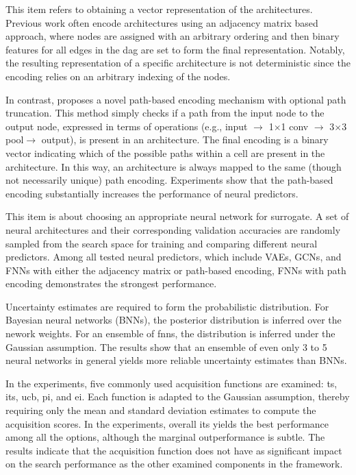 \documentclass[a4paper,oneside,bibliography=totoc]{scrbook}
\begin{document}
\begin{description}[leftmargin=0cm, listparindent=\parindent]
	\item [Architecture Encoding] This item refers to obtaining a vector representation of the architectures. Previous work often encode architectures using an adjacency matrix based approach, where nodes are assigned with an arbitrary ordering  and then binary features for all edges in the \gls{dag} are set to form the final representation.	Notably, the resulting representation of a specific architecture is not deterministic since the encoding  relies on an arbitrary indexing of the nodes. 
 
	In contrast, \cite{white2019bananas} proposes a novel path-based encoding mechanism with optional path truncation. This method simply checks if a path from the input node to the output node, expressed in terms of operations (e.g., input $\rightarrow$ 1$\times$1 conv $\rightarrow$ 3$\times$3 pool$\rightarrow$ output), is present in an architecture. The final encoding is a binary vector indicating which of the possible paths within a cell are present in the architecture. In this way, an architecture is always mapped to the same (though not necessarily unique) path encoding. Experiments show that the path-based encoding substantially increases the performance of neural predictors.
	
	\item [Neural Predictor] This item is about choosing an appropriate neural network for surrogate. A set of neural architectures and their corresponding validation accuracies are randomly sampled from the search space for training and comparing different neural predictors. Among all tested neural predictors, which include VAEs, GCNs, and FNNs with either the adjacency matrix or path-based encoding, FNNs with path encoding demonstrates the strongest performance.
	 
	\item [Uncertainty Estimation] Uncertainty estimates are required to form the probabilistic distribution. For Bayesian neural networks (BNNs), the posterior distribution is inferred over the nework weights. For an ensemble of \gls{fnns}, the distribution is inferred under the Gaussian assumption. The results show that an ensemble of even only 3 to 5 neural networks in general yields more reliable uncertainty estimates than BNNs.
	
	\item [Acquisition Function] In the experiments, five commonly used acquisition functions are examined: \gls{ts}, \gls{its}, \gls{ucb}, \gls{pi}, and \gls{ei}. Each function is adapted to the Gaussian assumption, thereby requiring only the mean and standard deviation estimates to compute the acquisition scores. In the experiments, overall \gls{its} yields the best performance among all the options, although the marginal outperformance is subtle. The results indicate that the acquisition function does not have as significant impact on the search performance as the other examined components in the framework.
		

\end{description}
\end{document}
